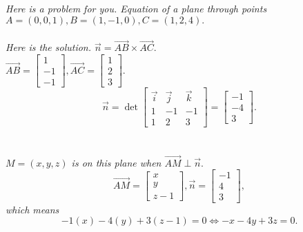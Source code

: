 \documentclass[addpoints]{exam}
\begin{document}
\textit{
Here is a problem for you. Equation of a plane through points $A=(0,0,1), B=(1,-1,0), C= (1,2,4).$\\\\
Here is the solution. $\vec{n}=\vec{AB}\times\vec{AC}.$\\
$\vec{AB}=\begin{bmatrix}
    1\\-1\\-1
\end{bmatrix}, \vec{AC}=\begin{bmatrix}
    1\\2\\3
\end{bmatrix}.$ $$\vec{n}=\det\begin{bmatrix}
    \vec{i}&\vec{j}&\vec{k}\\1&-1&-1\\1&2&3
\end{bmatrix}=\begin{bmatrix}
    -1\\-4\\3
\end{bmatrix}.$$ \\\\ $M=(x,y,z)$ is on this plane when $\vec{AM} \perp \vec{n}.$ $$\vec{AM}= \begin{bmatrix}
    x\\y\\z-1
\end{bmatrix}, \vec{n}=\begin{bmatrix}
    -1\\4\\3
\end{bmatrix},$$ which means $$-1(x)-4(y)+3(z-1)=0\Leftrightarrow -x-4y+3z=0.$$
}
\end{document}
